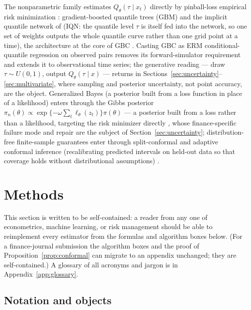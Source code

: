 \documentclass[11pt]{article}
\theoremstyle{remark}
\begin{document}
The nonparametric family estimates $Q_\theta(\tau \mid x_t)$ directly by
pinball-loss empirical risk minimization \citep{koenker1978}:
gradient-boosted quantile
trees (GBM) and the implicit quantile network of \citet{dabney2018iqn}
(IQN: the quantile level $\tau$ is itself fed into the network, so one
set of weights outputs the whole quantile curve rather than one grid
point at a time),
the architecture at the core of GBC \citep{polson2023gbc,
nareklishvili2025gqbp}. Casting GBC as ERM conditional-quantile
regression on observed pairs removes its forward-simulator requirement
and extends it to observational time series; the generative reading ---
draw $\tau \sim U(0,1)$, output $Q_\theta(\tau \mid x)$ --- returns in
Sections~\ref{sec:uncertainty}--\ref{sec:multivariate}, where sampling and
posterior uncertainty, not point accuracy, are the object. Generalized
Bayes (a posterior built from a loss function in place of a likelihood)
enters through the Gibbs posterior $\pi_n(\theta) \propto
\exp\{-\omega \sum_t \ell_\theta(z_t)\}\pi(\theta)$ --- a posterior
built from a loss rather than a likelihood, targeting the risk minimizer
directly
\citep{jiang2008gibbs, bissiri2016general}, whose finance-specific failure mode and
repair are the subject of Section~\ref{sec:uncertainty}; distribution-free
finite-sample guarantees enter through split-conformal and adaptive
conformal inference (recalibrating predicted intervals on held-out data
so that coverage holds without distributional assumptions)
\citep{gibbs2021aci}.

\section{Methods}\label{sec:methods}

This section is written to be self-contained: a reader from any one of
econometrics, machine learning, or risk management should be able to
reimplement every estimator from the formulas and algorithm boxes below.
(For a finance-journal submission the algorithm boxes and the proof of
Proposition~\ref{prop:conformal} can migrate to an appendix unchanged;
they are self-contained.) A glossary of all acronyms and jargon is in
Appendix~\ref{app:glossary}.

\subsection{Notation and objects}\label{sec:notation}
\end{document}
